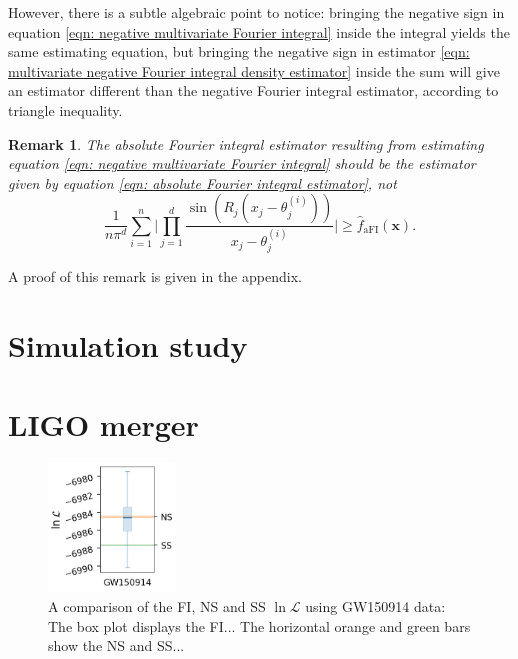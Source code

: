 \documentclass[%
 reprint,
 amsmath,amssymb,
 aps,
]{revtex4-2}
\newtheorem{remark}[theorem]{Remark}
\begin{document}
However, there is a subtle algebraic point to notice: bringing the negative sign in equation \eqref{eqn: negative multivariate Fourier integral} inside the integral yields the same estimating equation, but bringing the negative sign in estimator \eqref{eqn: multivariate negative Fourier integral density estimator} inside the sum will give an estimator different than the negative Fourier integral estimator, according to triangle inequality.
\begin{remark} \label{remark: triangle inequality in aFI}
    The absolute Fourier integral estimator resulting from estimating equation \eqref{eqn: negative multivariate Fourier integral} should be the estimator given by equation \eqref{eqn: absolute Fourier integral estimator}, not
    \begin{equation*}
        \frac{1}{n\pi^d}\sum_{i = 1}^n \bigg|\prod_{j = 1}^d \frac{\sin(R_j(x_j - \theta_j^{(i)}))}{x_j - \theta_j^{(i)}}\bigg| \ge \hat{f}_\text{aFI}(\mathbf{x}).
    \end{equation*}
\end{remark}
A proof of this remark is given in the appendix.







\section{\label{sec:simulation study} Simulation study}

\section{\label{sec:LIGO} LIGO merger}

\begin{figure}[h]
\caption{A comparison of the FI, NS and SS $\ln \mathcal{L}$ using GW150914 data: The box plot displays the FI... The horizontal orange and green bars show the NS and SS... }
\centering
\includegraphics[width=0.3\textwidth]{pictures/GW150914.png}
\end{figure}
\end{document}

